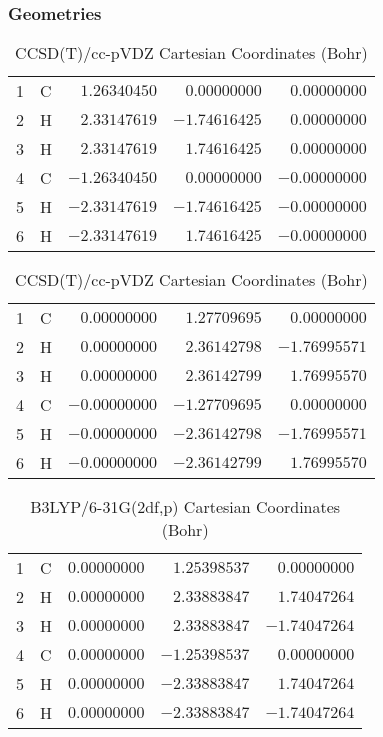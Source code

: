 \documentclass[10pt,oneside]{article}
\begin{document}
\begin{table}[h!]
\subsubsection*{Geometries}
\begin{multicols}{2}
\centering
\caption{CCSD(T)/cc-pVTZ Cartesian Coordinates (Bohr)}
\begin{tabular}{llrrr}
\toprule
1  & C  & $ 1.26340450$ & $ 0.00000000$ & $ 0.00000000$ \\
2  & H  & $ 2.33147619$ & $-1.74616425$ & $ 0.00000000$ \\
3  & H  & $ 2.33147619$ & $ 1.74616425$ & $ 0.00000000$ \\
4  & C  & $-1.26340450$ & $ 0.00000000$ & $-0.00000000$ \\
5  & H  & $-2.33147619$ & $-1.74616425$ & $-0.00000000$ \\
6  & H  & $-2.33147619$ & $ 1.74616425$ & $-0.00000000$ \\
\bottomrule
\end{tabular}
\caption{CCSD(T)/cc-pVDZ Cartesian Coordinates (Bohr)}
\begin{tabular}{llrrr}
\toprule
1  & C  & $ 0.00000000$ & $ 1.27709695$ & $ 0.00000000$ \\
2  & H  & $ 0.00000000$ & $ 2.36142798$ & $-1.76995571$ \\
3  & H  & $ 0.00000000$ & $ 2.36142799$ & $ 1.76995570$ \\
4  & C  & $-0.00000000$ & $-1.27709695$ & $ 0.00000000$ \\
5  & H  & $-0.00000000$ & $-2.36142798$ & $-1.76995571$ \\
6  & H  & $-0.00000000$ & $-2.36142799$ & $ 1.76995570$ \\
\bottomrule
\end{tabular}
\end{multicols}
\end{table}

\begin{table}[h]
\centering
\caption{B3LYP/6-31G(2df,p) Cartesian Coordinates (Bohr)}
\begin{tabular}{llrrr}
\toprule
1  & C  & $ 0.00000000$ & $ 1.25398537$ & $ 0.00000000$ \\
2  & H  & $ 0.00000000$ & $ 2.33883847$ & $ 1.74047264$ \\
3  & H  & $ 0.00000000$ & $ 2.33883847$ & $-1.74047264$ \\
4  & C  & $ 0.00000000$ & $-1.25398537$ & $ 0.00000000$ \\
5  & H  & $ 0.00000000$ & $-2.33883847$ & $ 1.74047264$ \\
6  & H  & $ 0.00000000$ & $-2.33883847$ & $-1.74047264$ \\
\bottomrule
\end{tabular}
\end{table}
\end{document}
